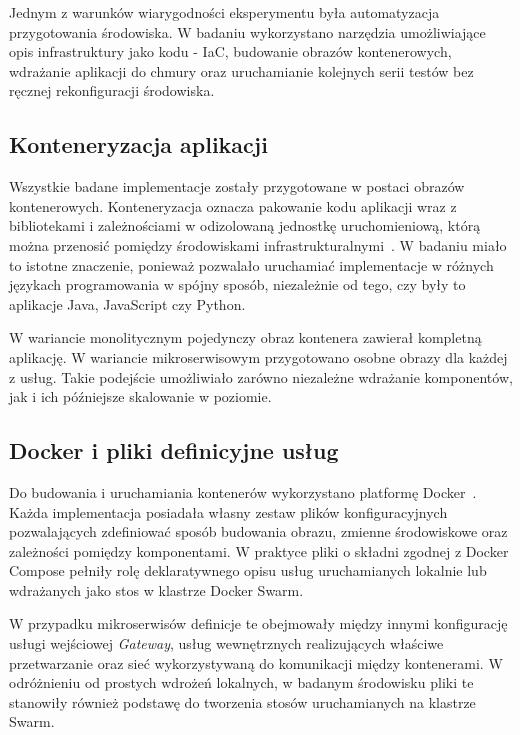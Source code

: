 Jednym z warunków wiarygodności eksperymentu była automatyzacja przygotowania środowiska. W badaniu wykorzystano narzędzia umożliwiające opis infrastruktury jako kodu - IaC, budowanie obrazów kontenerowych, wdrażanie aplikacji do chmury oraz uruchamianie kolejnych serii testów bez ręcznej rekonfiguracji środowiska.

\subsection{Konteneryzacja aplikacji}

Wszystkie badane implementacje zostały przygotowane w postaci obrazów kontenerowych. Konteneryzacja oznacza pakowanie kodu aplikacji wraz z bibliotekami i zależnościami w odizolowaną jednostkę uruchomieniową, którą można przenosić pomiędzy środowiskami infrastrukturalnymi~\cite{main_konteneryzacja}. W badaniu miało to istotne znaczenie, ponieważ pozwalało uruchamiać implementacje w różnych językach programowania w spójny sposób, niezależnie od tego, czy były to aplikacje Java, JavaScript czy Python.

W wariancie monolitycznym pojedynczy obraz kontenera zawierał kompletną aplikację. W wariancie mikroserwisowym przygotowano osobne obrazy dla każdej z usług. Takie podejście umożliwiało zarówno niezależne wdrażanie komponentów, jak i ich późniejsze skalowanie w poziomie.

\subsection{Docker i pliki definicyjne usług}

Do budowania i uruchamiania kontenerów wykorzystano platformę Docker~\cite{dockerdocs}. Każda implementacja posiadała własny zestaw plików konfiguracyjnych pozwalających zdefiniować sposób budowania obrazu, zmienne środowiskowe oraz zależności pomiędzy komponentami. W praktyce pliki o składni zgodnej z Docker Compose pełniły rolę deklaratywnego opisu usług uruchamianych lokalnie lub wdrażanych jako stos w klastrze Docker Swarm.

W przypadku mikroserwisów definicje te obejmowały między innymi konfigurację usługi wejściowej \textit{Gateway}, usług wewnętrznych realizujących właściwe przetwarzanie oraz sieć wykorzystywaną do komunikacji między kontenerami. W odróżnieniu od prostych wdrożeń lokalnych, w badanym środowisku pliki te stanowiły również podstawę do tworzenia stosów uruchamianych na klastrze Swarm.

